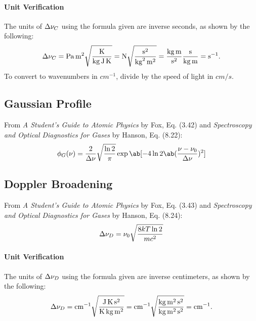 \documentclass[11pt, twoside, fleqn]{report}
\begin{document}
\paragraph{Unit Verification}

The units of $\adif{\nu}_{C}$ using the formula given are inverse seconds, as shown by the following:
\begin{equation*}
    \adif{\nu}_{C} = \unit{Pa.m^{2}}\sqrt{\frac{\unit{K}}{\unit{kg.J.K}}} = \unit{N}\sqrt{\frac{\unit{s^{2}}}{\unit{kg^{2}.m^{2}}}} = \frac{\unit{kg.m}}{\unit{s^{2}}}\frac{\unit{s}}{\unit{kg.m}} = \unit{s^{-1}}.
\end{equation*}
To convert to wavenumbers in $\unit{cm^{-1}}$, divide by the speed of light in $\unit{cm/s}$.

\subsection{Gaussian Profile}

From \textit{A Student's Guide to Atomic Physics} by Fox, Eq. (3.42) and \textit{Spectroscopy and Optical Diagnostics for Gases} by Hanson, Eq. (8.22):
\begin{equation*}
    \phi_{G}(\nu) = \frac{2}{\adif{\nu}}\sqrt{\frac{\ln{2}}{\pi}}\exp\ab[-4\ln{2}\ab(\frac{\nu - \nu_{0}}{\adif{\nu}})^{2}]
\end{equation*}

\subsection{Doppler Broadening}

From \textit{A Student's Guide to Atomic Physics} by Fox, Eq. (3.43) and \textit{Spectroscopy and Optical Diagnostics for Gases} by Hanson, Eq. (8.24):
\begin{equation*}
    \adif{\nu}_{D} = \nu_{0}\sqrt{\frac{8kT\ln{2}}{mc^{2}}}
\end{equation*}

\paragraph{Unit Verification}

The units of $\adif{\nu}_{D}$ using the formula given are inverse centimeters, as shown by the following:
\begin{equation*}
    \adif{\nu}_{D} = \unit{cm^{-1}}\sqrt{\frac{\unit{J.K.s^{2}}}{\unit{K.kg.m^{2}}}} = \unit{cm^{-1}}\sqrt{\frac{\unit{kg.m^{2}.s^{2}}}{\unit{kg.m^{2}.s^{2}}}} = \unit{cm^{-1}}.
\end{equation*}
\end{document}
